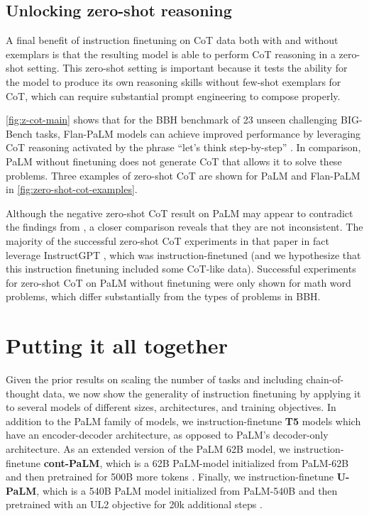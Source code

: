 \subsection{Unlocking zero-shot reasoning}\label{subsec:unlock-zs-cot}

A final benefit of instruction finetuning on CoT data both with and without exemplars is that the resulting model is able to perform CoT reasoning in a zero-shot setting. This zero-shot setting is important because it tests the ability for the model to produce its own reasoning skills without few-shot exemplars for CoT, which can require substantial prompt engineering to compose properly.

\ref{fig:z-cot-main} shows that for the BBH benchmark of 23 unseen challenging BIG-Bench tasks, Flan-PaLM models can achieve improved performance by leveraging CoT reasoning activated by the phrase ``let's think step-by-step'' \citep{kojima2022large}. In comparison, PaLM without finetuning does not generate CoT that allows it to solve these problems. Three examples of zero-shot CoT are shown for PaLM and Flan-PaLM in \ref{fig:zero-shot-cot-examples}.

Although the negative zero-shot CoT result on PaLM may appear to contradict the findings from \citet{kojima2022large}, a closer comparison reveals that they are not inconsistent. The majority of the successful zero-shot CoT experiments in that paper in fact leverage InstructGPT \citep{ouyang2022training}, which was instruction-finetuned (and we hypothesize that this instruction finetuning included some CoT-like data). Successful experiments for zero-shot CoT on PaLM without finetuning were only shown for math word problems, which differ substantially from the types of problems in BBH.

\section{Putting it all together}\label{sec:putting-it-all-together}

Given the prior results on scaling the number of tasks and including chain-of-thought data, we now show the generality of instruction finetuning by applying it to several models of different sizes, architectures, and training objectives. In addition to the PaLM family of models, we instruction-finetune \textbf{T5} models which have an encoder-decoder architecture, as opposed to PaLM's decoder-only architecture. As an extended version of the PaLM 62B model, we instruction-finetune \textbf{cont-PaLM}, which is a 62B PaLM-model initialized from PaLM-62B and then pretrained for 500B more tokens \citep{chowdhery2022palm}. Finally, we instruction-finetune \textbf{U-PaLM}, which is a 540B PaLM model initialized from PaLM-540B and then pretrained with an UL2 objective for 20k additional steps \citep{tay2022unifying,tay2022transcending}. 

